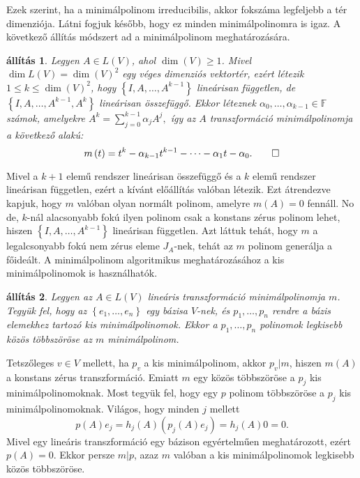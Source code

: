 \documentclass[a4paper, showtrims]{memoir}
\makeatletter
\renewenvironment{proof}[1][\proofname]
    {\par\pushQED{\qed}%
    \normalfont \topsep6\p@\@plus6\p@\relax
    \trivlist
    \item[\hskip\labelsep
        \itshape
    #1\@addpunct{:}]\ignorespaces}
    {\popQED\endtrivlist\@endpefalse}
\theoremstyle{plain}
\newtheorem{proposition}{állítás}[chapter]
\theoremstyle{remark}
\theoremstyle{definition}
\makeatother
\begin{document}
Ezek szerint, ha a minimálpolinom irreducibilis, akkor fokszáma legfeljebb a tér dimenziója. 
Látni fogjuk később, hogy ez minden minimálpolinomra is igaz.
A következő állítás módszert ad a minimálpolinom meghatározására.
\begin{proposition}
	Legyen $A\in L\left( V \right)$, ahol $\dim(V)\geq 1$.
	Mivel $\dim L\left( V \right)=\dim(V)^2$ egy véges dimenziós vektortér,
	ezért létezik $1\leq k \leq \dim(V)^2$,
	hogy
	$\left\{ I,A,\ldots,A^{k-1} \right\}$ lineárisan független,
	de $\left\{ I,A,\ldots,A^{k-1},A^{k} \right\}$ lineárisan összefüggő.
	Ekkor léteznek $\alpha_0,\ldots,\alpha_{k-1}\in\mathbb{F}$
	számok, amelyekre
	\(
		A^{k}=\sum_{j=0}^{k-1}\alpha_jA^{j},
	\)
	így az $A$ transzformáció minimálpolinomja a következő alakú:
	\[
		m\left( t \right)=
		t^k-\alpha_{k-1}t^{k-1}-\dots-\alpha_1t-\alpha_0.\qedhere
	\]
\end{proposition}
\begin{proof}
	Mivel a $k+1$ elemű rendszer lineárisan összefüggő és a $k$ elemű rendszer lineárisan független,
	ezért a kívánt előállítás valóban létezik.
	Ezt átrendezve kapjuk, hogy $m$ valóban olyan normált polinom, amelyre $m\left( A \right)=0$ fennáll.
	No de, $k$-nál alacsonyabb fokú ilyen polinom csak a konstans zérus polinom lehet,
	hiszen $\left\{ I,A,\ldots,A^{k-1} \right\}$ lineárisan független.
	Azt láttuk tehát, hogy $m$ a legalcsonyabb fokú nem zérus eleme $J_{A}$-nek,
	tehát az $m$ polinom generálja a főideált.
\end{proof}
A minimálpolinom algoritmikus meghatározásához a kis minimálpolinomok is használhatók.
\begin{proposition}
    \label{pr:lkkt-minimalpolinom}
	Legyen az $A\in L\left( V \right)$ lineáris transzformáció minimálpolinomja $m$.
	Tegyük fel, hogy az $\left\{ e_1,\ldots,e_n \right\}$ egy bázisa $V$-nek,
	és $p_1,\ldots,p_n$ rendre a bázis elemekhez tartozó kis minimálpolinomok.
	Ekkor a $p_1,\ldots,p_n$ polinomok legkisebb közös többszöröse az $m$ minimálpolinom.
\end{proposition}
\begin{proof}
	Tetszőleges $v\in V$ mellett, ha $p_v$ a kis minimálpolinom,
	akkor $p_v|m$, hiszen $m\left( A \right)$ a konstans zérus transzformáció.
	Emiatt $m$ egy közös többszöröse a $p_j$ kis minimálpolinomoknak.
	Most tegyük fel, hogy egy $p$ polinom többszöröse a $p_j$ kis minimálpolinomoknak.
	Világos, hogy minden $j$ mellett
	\[
		p\left( A \right)e_j
		=
		h_j\left( A \right)\left( p_j\left( A \right)e_j \right)
		=
		h_j\left( A \right)0
		=
		0.
	\]
	Mivel egy lineáris transzformáció egy bázison egyértelműen meghatározott, ezért
	$p\left( A \right)=0$.
	Ekkor persze $m|p$,
	azaz $m$ valóban  a kis minimálpolinomok legkisebb közös többszöröse.
\end{proof}
\end{document}
